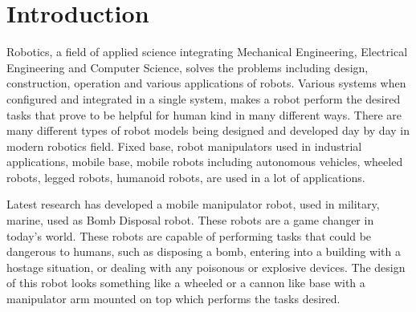 \documentclass[12pt]{article}
\begin{document}
\section{Introduction}
Robotics, a field of applied science integrating Mechanical Engineering, Electrical Engineering and Computer Science, solves the problems including design, construction, operation and various applications of robots. Various systems when configured and integrated in a single system, makes a robot perform the desired tasks that prove to be helpful for human kind in many different ways. There are many different types of robot models being designed and developed day by day in modern robotics field. Fixed base, robot manipulators used in industrial applications, mobile base, mobile robots including autonomous vehicles, wheeled robots, legged robots, humanoid robots, are used in a lot of applications.
\par \noindent 
Latest research has developed a mobile manipulator robot, used in military, marine, used as Bomb Disposal robot. These robots are a game changer in today's world. These robots are capable of performing tasks that could be dangerous to humans, such as disposing a bomb, entering into a building with a hostage situation, or dealing with any poisonous or explosive devices. The design of this robot looks something like a wheeled or a cannon like base with a manipulator arm mounted  on top which performs the tasks desired. 
\end{document}
